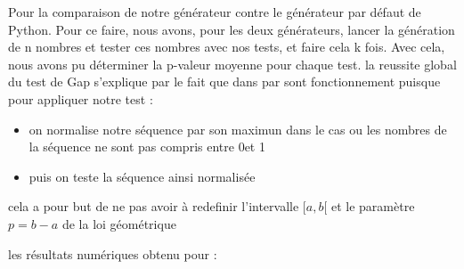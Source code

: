 
Pour la comparaison de notre générateur contre le générateur par défaut de Python. Pour ce faire, nous avons, pour les deux générateurs, lancer la génération de n nombres et tester ces nombres avec nos tests, et faire cela k fois. Avec cela, nous avons pu déterminer  la p-valeur moyenne pour chaque test. la reussite global du test de Gap s'explique par le fait que dans par sont fonctionnement puisque pour appliquer notre test :
\begin{itemize}
    \item on normalise notre séquence par son maximun dans le cas ou les nombres de la séquence ne sont pas compris entre 0et 1
    \item puis on teste la  séquence ainsi normalisée
\end{itemize}
    cela a pour but de ne pas avoir à redefinir l'intervalle $[a,b[$ et le paramètre $p = b-a $   de la loi géométrique


    les résultats numériques obtenu pour :


    \newpage

